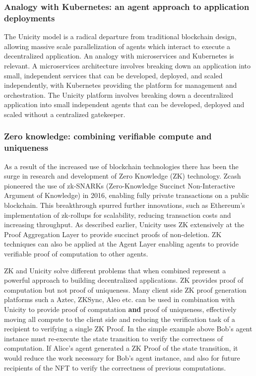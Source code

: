 \documentclass{article}
\begin{document}
\subsubsection{Analogy with Kubernetes: an agent approach to application deployments}

The Unicity model is a radical departure from traditional blockchain design, allowing massive scale parallelization of agents which interact to execute a decentralized application. An analogy with microservices and Kubernetes is relevant. A microservices architecture involves breaking down an application into small, independent services that can be developed, deployed, and scaled independently, with Kubernetes providing the platform for management and orchestration. The Unicity platform involves breaking down a decentralized application into small independent agents that can be developed, deployed and scaled without a centralized gatekeeper.


\subsubsection{Zero knowledge: combining verifiable compute and  uniqueness}

As a result of the increased use of blockchain technologies there has been the surge in research and development of Zero Knowledge (ZK) technology. Zcash pioneered the use of zk-SNARKs (Zero-Knowledge Succinct Non-Interactive Argument of Knowledge) in 2016, enabling fully private transactions on a public blockchain. This breakthrough spurred further innovations, such as Ethereum's implementation of zk-rollups for scalability, reducing transaction costs and increasing throughput. As described earlier, Unicity uses ZK extensively at the Proof Aggregation Layer to provide succinct proofs of non-deletion. ZK techniques can also be applied at the Agent Layer enabling agents to provide verifiable proof of computation to other agents.

ZK and Unicity solve different problems that when combined represent a powerful approach to building decentralized applications. ZK provides proof of computation but not proof of uniqueness. Many client side ZK proof generation platforms such a Aztec, ZKSync, Aleo etc. can be used in combination with Unicity to provide proof of computation \textbf{and} proof of uniqueness, effectively moving all compute to the client side and reducing the verification task of a recipient to verifying a single ZK Proof. In the simple example above Bob's agent instance must re-execute the state transition to verify the correctness of computation. If Alice's agent generated a ZK Proof of the state transition, it would reduce the work necessary for Bob's agent instance, and also for future recipients of the NFT to verify the correctness of previous computations.
\end{document}

